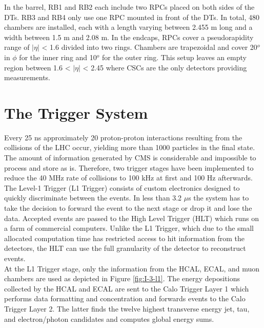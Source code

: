       In the barrel, RB1 and RB2 each include two RPCs placed on both sides of the DTs. RB3 and RB4 only use one RPC mounted in front of the DTs. In total, 480 chambers are installed, each with a length varying between 2.455 m long and a width between 1.5 m and 2.08 m. In the endcaps, RPCs cover a pseudorapidity range of $ | \eta | $ < 1.6 divided into two rings. Chambers are trapezoidal and cover 20$^o$ in $ \phi $ for the inner ring and 10$^o$ for the outer ring. This setup leaves an empty region between 1.6 < $ | \eta | $ < 2.45 where CSCs are the only detectors providing measurements.

  \section{The Trigger System}

    Every 25 ns approximately 20 proton-proton interactions resulting from the collisions of the LHC occur, yielding more than 1000 particles in the final state. The amount of information generated by CMS is considerable and impossible to process and store as is. Therefore, two trigger stages have been implemented to reduce the 40 MHz rate of collisions to 100 kHz at first and 100 Hz afterwards. The Level-1 Trigger (L1 Trigger) consists of custom electronics designed to quickly discriminate between the events. In less than 3.2 $\mu$s the system has to take the decision to forward the event to the next stage or drop it and lose the data. Accepted events are passed to the High Level Trigger (HLT) which runs on a farm of commercial computers. Unlike the L1 Trigger, which due to the small allocated computation time has restricted access to hit information from the detectors, the HLT can use the full granularity of the detector to reconstruct events. \\

    At the L1 Trigger stage, only the information from the HCAL, ECAL, and muon chambers are used as depicted in Figure \ref{fig:I-3-l1}. The energy depositions collected by the HCAL and ECAL are sent to the Calo Trigger Layer 1 which performs data formatting and concentration and forwards events to the Calo Trigger Layer 2. The latter finds the twelve highest transverse energy jet, tau, and electron/photon candidates and computes global energy sums. \\


